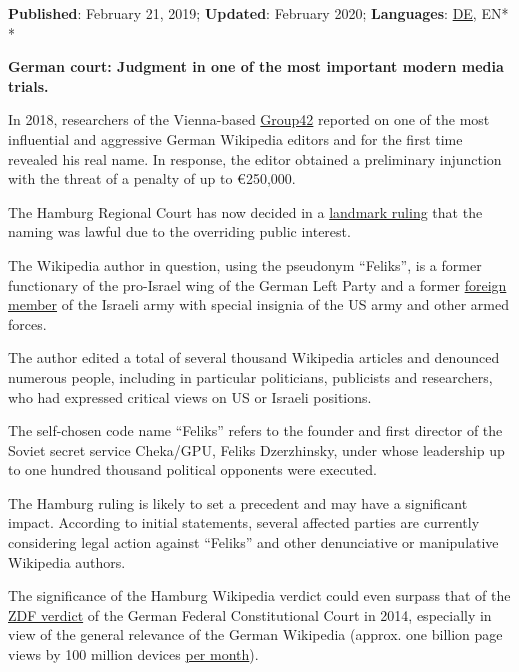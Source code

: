 \textbf{Published}: February 21, 2019; \textbf{Updated}: February 2020;
\textbf{Languages}: \href{https://swprs.org/der-wikipedia-prozess/}{DE},
EN*\\
*

\textbf{German court: Judgment in one of the most important modern media
trials.}

In 2018, researchers of the Vienna-based
\href{https://gruppe42.com/}{Group42} reported on one of the most
influential and aggressive German Wikipedia editors and for the first
time revealed his real name. In response, the editor obtained a
preliminary injunction with the threat of a penalty of up to €250,000.

The Hamburg Regional Court has now decided in a
\href{https://kenfm.de/tagesdosis-26-2-2019-wikipedia-manipulationen-feliks-darf-nach-gerichtsurteil-wieder-mit-klarnamen-genannt-werden/}{landmark
ruling} that the naming was lawful due to the overriding public
interest.

The Wikipedia author in question, using the pseudonym ``Feliks'', is a
former functionary of the pro-Israel wing of the German Left Party and a
former \href{https://en.wikipedia.org/wiki/Sar-El}{foreign member} of
the Israeli army with special insignia of the US army and other armed
forces.

The author edited a total of several thousand Wikipedia articles and
denounced numerous people, including in particular politicians,
publicists and researchers, who had expressed critical views on US or
Israeli positions.

The self-chosen code name ``Feliks'' refers to the founder and first
director of the Soviet secret service Cheka/GPU, Feliks Dzerzhinsky,
under whose leadership up to one hundred thousand political opponents
were executed.

The Hamburg ruling is likely to set a precedent and may have a
significant impact. According to initial statements, several affected
parties are currently considering legal action against ``Feliks'' and
other denunciative or manipulative Wikipedia authors.

The significance of the Hamburg Wikipedia verdict could even surpass
that of the
\href{http://www.spiegel.de/kultur/tv/verfassungsgericht-klage-gegen-zdf-staatsvertrag-a-960571.html}{ZDF
verdict} of the German Federal Constitutional Court in 2014, especially
in view of the general relevance of the German Wikipedia (approx. one
billion page views by 100 million devices
\href{https://stats.wikimedia.org/v2/\#/de.wikipedia.org}{per month}).

